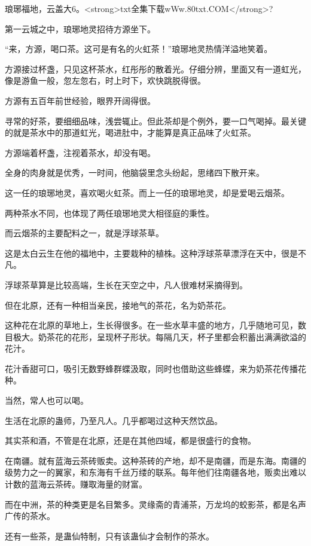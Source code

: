 
\begin{this_body}

琅琊福地，云盖大6。<strong>txt全集下载wWw.80txt.COM</strong>?

第一云城之中，琅琊地灵招待方源坐下。

“来，方源，喝口茶。这可是有名的火虹茶！”琅琊地灵热情洋溢地笑着。

方源接过杯盏，只见这杯茶水，红彤彤的散着光。仔细分辨，里面又有一道虹光，像是游鱼一般，忽左忽右，时上时下，欢快跳脱得很。

方源有五百年前世经验，眼界开阔得很。

寻常的好茶，要细细品味，浅尝辄止。但此茶却是个例外，要一口气喝掉。最关键的就是茶水中的那道虹光，喝进肚中，才能算是真正品味了火虹茶。

方源端着杯盏，注视着茶水，却没有喝。

全身的肉身就是优秀，一时间，他脑袋里念头纷起，思绪四下散开来。

这一任的琅琊地灵，喜欢喝火虹茶。而上一任的琅琊地灵，却是爱喝云烟茶。

两种茶水不同，也体现了两任琅琊地灵大相径庭的秉性。

而云烟茶的主要配料之一，就是浮球茶草。

这是太白云生在他的福地中，主要栽种的植株。这种浮球茶草漂浮在天中，很是不凡。

浮球茶草算是比较高端，生长在天空之中，凡人很难材采摘得到。

但在北原，还有一种相当亲民，接地气的茶花，名为奶茶花。

这种花在北原的草地上，生长得很多。在一些水草丰盛的地方，几乎随地可见，数目极大。奶茶花的花形，呈现杯子形状。每隔几天，杯子里都会积蓄出满满欲溢的花汁。

花汁香甜可口，吸引无数野蜂群蝶汲取，同时也借助这些蜂蝶，来为奶茶花传播花种。

当然，常人也可以喝。

生活在北原的蛊师，乃至凡人。几乎都喝过这种天然饮品。

其实茶和酒，不管是在北原，还是在其他四域，都是很盛行的食物。

在南疆。就有蓝海云茶砖贩卖。这种茶砖的产地，却不是南疆，而是东海。南疆的级势力之一的翼家，和东海有千丝万缕的联系。每年他们往南疆各地，贩卖出难以计数的蓝海云茶砖。赚取海量的财富。

而在中洲，茶的种类更是名目繁多。灵缘斋的青浦茶，万龙坞的蛟影茶，都是名声广传的茶水。

还有一些茶，是蛊仙特制，只有该蛊仙才会制作的茶水。


\end{this_body}
